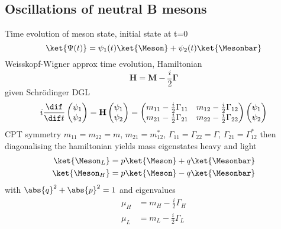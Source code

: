 \subsection{Oscillations of neutral B mesons}
\label{sec:cpv_theory:flavour_physics:bmixing}

Time evolution of meson state, initial state at t=0
%
\begin{equation}
  \ket{\Psi(t)} = \psi_1(t) \ket{\Meson} + \psi_2(t) \ket{\Mesonbar}
\end{equation}
%
Weisskopf-Wigner approx time evolution, Hamiltonian
%
\begin{equation}
  \mathbf{H} = \mathbf{M} - \frac{i}{2} \mathbf{\Gamma}
\end{equation}
%
given Schrödinger DGL
%
\begin{equation}
  i \frac{\dif}{\dif t} 
  \begin{pmatrix}
    \psi_1 \\
    \psi_2
  \end{pmatrix}
  =
  \mathbf{H}
  \begin{pmatrix}
    \psi_1 \\
    \psi_2
  \end{pmatrix}
  =
  \begin{pmatrix}
    m_{11} - \frac{i}{2} \Gamma_{11}    & m_{12} - \frac{i}{2} \Gamma_{12} \\
    m_{21} - \frac{i}{2} \Gamma_{21}    & m_{22} - \frac{i}{2} \Gamma_{22} \\
  \end{pmatrix}
  \begin{pmatrix}
    \psi_1 \\
    \psi_2
  \end{pmatrix}
\end{equation}
%
CPT symmetry $m_{11} = m_{22} = m$, $m_{21} = m_{12}^{\ast}$, $\Gamma_{11} = \Gamma_{22} = \Gamma$, $\Gamma_{21} = \Gamma_{12}^{\ast}$
%
then diagonalising the hamiltonian yields mass eigenstates heavy and light
%
\begin{equation}
  \begin{split}
    \ket{\Meson_L} &= p \ket{\Meson} + q \ket{\Mesonbar} \\
    \ket{\Meson_H} &= p \ket{\Meson} - q \ket{\Mesonbar}
  \end{split}
\end{equation}
%
with $\abs{q}^2 + \abs{p}^2 = 1$ and eigenvalues
%
\begin{equation}
  \begin{split}
    \mu_H &= m_H - \frac{i}{2} \Gamma_H \\
    \mu_L &= m_L - \frac{i}{2} \Gamma_L
  \end{split}
\end{equation}
